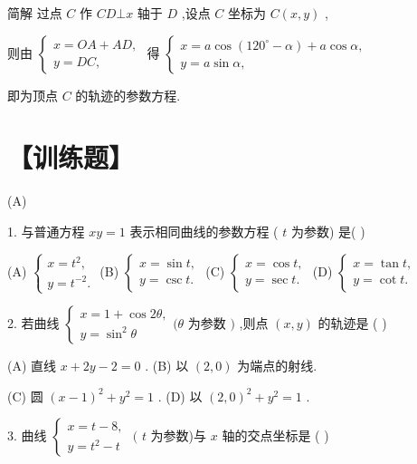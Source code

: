\documentclass[10pt]{article}
\begin{document}
简解 过点 \(C\) 作 \({CD} \bot  x\) 轴于 \(D\) ,设点 \(C\) 坐标为 \(C\left( {x,y}\right)\) ,

则由 \(\left\{  \begin{array}{l} x = {OA} + {AD}, \\  y = {DC}, \end{array}\right.\) 得 \(\left\{  \begin{array}{l} x = a\cos \left( {{120}^{ \circ  } - \alpha }\right)  + a\cos \alpha , \\  y = a\sin \alpha , \end{array}\right.\)

即为顶点 \(C\) 的轨迹的参数方程.

\section*{【训练题】}

(A)

1. 与普通方程 \({xy} = 1\) 表示相同曲线的参数方程 ( \(t\) 为参数) 是( )

(A) \(\left\{  \begin{array}{l} x = {t}^{2}, \\  y = {t}^{-2}. \end{array}\right.\) (B) \(\left\{  \begin{array}{l} x = \sin t, \\  y = \csc t. \end{array}\right.\) (C) \(\left\{  \begin{array}{l} x = \cos t, \\  y = \sec t. \end{array}\right.\) (D) \(\left\{  \begin{array}{l} x = \tan t, \\  y = \cot t. \end{array}\right.\)

2. 若曲线 \(\left\{  {\begin{array}{l} x = 1 + \cos {2\theta }, \\  y = {\sin }^{2}\theta  \end{array}(\theta }\right.\) 为参数 \()\) ,则点 \(\left( {x,y}\right)\) 的轨迹是 ( )

(A) 直线 \(x + {2y} - 2 = 0\) . (B) 以 \(\left( {2,0}\right)\) 为端点的射线.

(C) 圆 \({\left( x - 1\right) }^{2} + {y}^{2} = 1\) . (D) 以 \({\left( 2,0\right) }^{2} + {y}^{2} = 1\) .

3. 曲线 \(\left\{  {\begin{array}{l} x = t - 8, \\  y = {t}^{2} - t \end{array}\text{ ( }t}\right.\) 为参数)与 \(x\) 轴的交点坐标是 ( )
\end{document}
